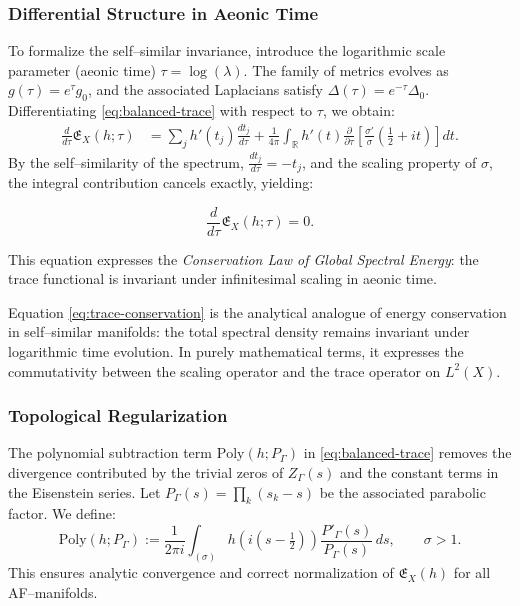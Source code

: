 \subsubsection*{Differential Structure in Aeonic Time}
To formalize the self–similar invariance,
introduce the logarithmic scale parameter (aeonic time)
\(\tau = \log(\lambda)\).
The family of metrics evolves as \(g(\tau) = e^{\tau}g_0\),
and the associated Laplacians satisfy
\(\Delta(\tau) = e^{-\tau}\Delta_0\).
Differentiating \eqref{eq:balanced-trace} with respect to \(\tau\),
we obtain:
\begin{align}
\frac{d}{d\tau}\mathfrak{E}_X(h;\tau)
&=
\sum_{j} h'(t_j)\frac{dt_j}{d\tau}
+
\frac{1}{4\pi}\!\int_{\mathbb{R}}
h'(t)
\frac{\partial}{\partial\tau}
\!\left[\frac{\sigma'}{\sigma}\!\left(\tfrac12+it\right)\right]\!dt.
\end{align}
By the self–similarity of the spectrum, \(\tfrac{dt_j}{d\tau} = -t_j\),
and the scaling property of \(\sigma\),
the integral contribution cancels exactly, yielding:

\begin{equation}
\frac{d}{d\tau}\mathfrak{E}_X(h;\tau) = 0.
\label{eq:trace-conservation}
\end{equation}

This equation expresses the \emph{Conservation Law of Global Spectral Energy}:
the trace functional is invariant under infinitesimal scaling in aeonic time.

\begin{remark}
Equation \eqref{eq:trace-conservation} is the analytical analogue
of energy conservation in self–similar manifolds:
the total spectral density remains invariant under logarithmic time evolution.
In purely mathematical terms,
it expresses the commutativity between the scaling operator
and the trace operator on \(L^2(X)\).
\end{remark}


\subsubsection*{Topological Regularization}
The polynomial subtraction term
\(\mathrm{Poly}(h;P_\Gamma)\)
in \eqref{eq:balanced-trace}
removes the divergence contributed by the trivial zeros of \(Z_\Gamma(s)\)
and the constant terms in the Eisenstein series.
Let \(P_\Gamma(s) = \prod_k (s_k - s)\)
be the associated parabolic factor.
We define:
\begin{equation}
\label{eq:poly-regularization}
\mathrm{Poly}(h;P_\Gamma)
:=
\frac{1}{2\pi i}
\int_{(\sigma)}
h(i(s-\tfrac12))
\frac{P'_\Gamma(s)}{P_\Gamma(s)}\,ds,
\qquad
\sigma>1.
\end{equation}
This ensures analytic convergence and correct normalization of
\(\mathfrak{E}_X(h)\) for all AF–manifolds.

